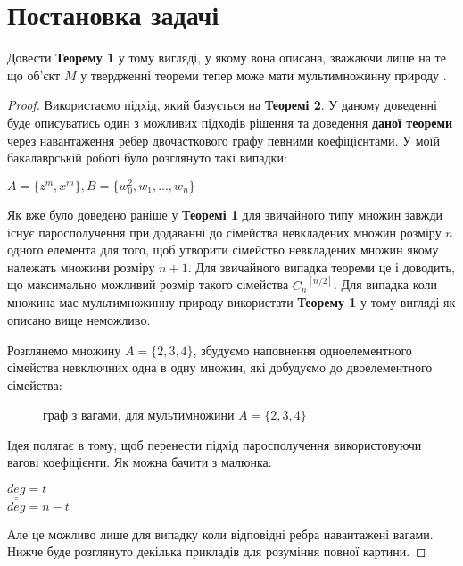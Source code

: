 \section{Постановка задачі}

\begin{theorem}
Довести {\bf Теорему 1} у тому вигляді, у якому вона описана, зважаючи лише на те що об'єкт $M$ у твердженні теореми тепер може мати мультимножинну природу \cite{my_article:2021}.
\end{theorem}

\begin{proof}
Використаємо підхід, який базується на {\bf Теоремі 2}. У даному доведенні буде описуватись один з можливих підходів рішення та доведення {\bf даної теореми} через навантаження ребер двочасткового графу певними коефіцієнтами.
У моїй бакалаврській роботі було розглянуто такі випадки: 
\begin{center}
$A = \{z^m,x^m\}, B = \{w_0^{2}, w_1,...,w_n\}$
\end{center}

Як вже було доведено раніше у {\bf Теоремі 1} для звичайного типу множин завжди існує паросполучення при додаванні до сімейства невкладених множин розміру $n$ одного елемента для того, щоб утворити сімейство невкладених множин якому належать множини розміру $n+1$. Для звичайного випадка теореми це і доводить, що максимально можливий розмір такого сімейства ${C_n}^{[n/2]}$. Для випадка коли множина має мультимножинну природу використати {\bf Теорему 1} у тому вигляді як описано вище неможливо.

\begin{example}

Розглянемо множину $ A = \{2,3,4\} $, збудуємо наповнення одноелементного сімейства невключних одна в одну множин, які добудуємо до двоелементного сімейства:
\begin{figure}
\begin{center}
\end{center}
\caption{граф з вагами, для мультимножини $ A = \{2,3,4\}$}
\end{figure}
\end{example}

Ідея полягає в тому, щоб перенести підхід паросполучення використовуючи вагові коефіцієнти.
Як можна бачити з малюнка:
\begin{center}
$ \underline{deg} = t $
\\
$ \overline{deg} = n - t $
\end{center}
Але це можливо лише для випадку коли відповідні ребра навантажені вагами. Нижче буде розглянуто декілька прикладів для розуміння повної картини.
\end{proof}


